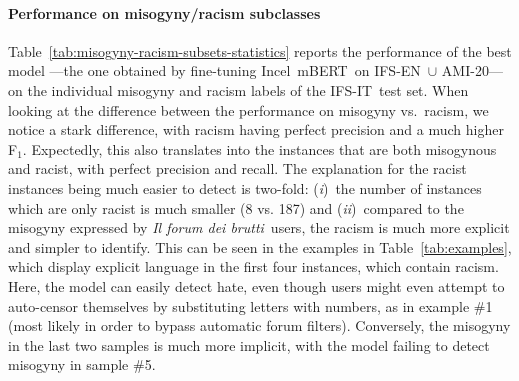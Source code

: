 \documentclass[
twocolumn,
]{ceurart}
\newcommand{\Ni}{(\textit{i})~}
\newcommand{\Nii}{(\textit{ii})~}
\newcommand{\dsENclassification}{IFS-EN}
\newcommand{\dsITclassification}{IFS-IT}
\newcommand{\imbert}{\mbox{Incel mBERT}}
\newcommand{\ami}{\mbox{AMI-20}}
\newcommand{\itforum}{\textit{Il forum dei brutti}}
\begin{document}
\paragraph{Performance on misogyny/racism subclasses}

Table~\ref{tab:misogyny-racism-subsets-statistics} reports the performance of the best model ---the one obtained by fine-tuning \imbert\, on \dsENclassification\, $\cup$ \ami--- on the individual misogyny and racism labels of the \dsITclassification\, test set.
When looking at the difference between the performance on misogyny vs.\ racism, we notice a stark difference, with racism having perfect precision and a much higher F$_1$. Expectedly, this also translates into the instances that are both misogynous and racist, with perfect precision and recall.
The explanation for the racist instances being much easier to detect is two-fold:
\Ni the number of instances which are only racist is much smaller (8 vs. 187) and
\Nii  compared to the misogyny expressed by \itforum\, users, the racism is much more explicit and simpler to identify.
This can be seen in the examples in Table~\ref{tab:examples}, which display explicit language in the first four instances, which contain racism. Here, the model can easily detect hate, even though users might even attempt to auto-censor themselves by substituting letters with numbers, as in example \#1 (most likely in order to bypass automatic forum filters). Conversely, the misogyny in the last two samples is much more implicit, with the model failing to detect misogyny in sample \#5.
\end{document}
